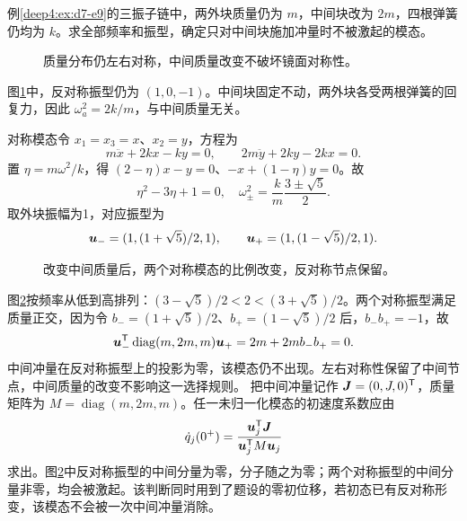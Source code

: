 \begin{exercise}[中间质量改变后的三振子链]\label{deep4:problem-exercise-10}\label{deep4:ex:d7-h10}
例\ref{deep4:ex:d7-e9}的三振子链中，两外块质量仍为 $m$，中间块改为 $2m$，四根弹簧仍均为 $k$。求全部频率和振型，确定只对中间块施加冲量时不被激起的模态。
\end{exercise}
\begin{figure}[H]\centering
{}
\caption{质量分布仍左右对称，中间质量改变不破坏镜面对称性。}\label{deep4:fig:d7-h10-q}
\end{figure}
\begin{solution}
图\ref{deep4:fig:d7-h10-q}中，反对称振型仍为 $(1,0,-1)$。中间块固定不动，两外块各受两根弹簧的回复力，因此 $\omega_a^2=2k/m$，与中间质量无关。

对称模态令 $x_1=x_3=x$、$x_2=y$，方程为
\[
m\ddot x+2kx-ky=0,\qquad
2m\ddot y+2ky-2kx=0.
\]
置 $\eta=m\omega^2/k$，得 $(2-\eta)x-y=0$、$-x+(1-\eta)y=0$。故
\[
\eta^2-3\eta+1=0,
\quad \boxed{\omega_\pm^2=\frac{k}{m}\frac{3\pm\sqrt5}{2}.}
\]
取外块振幅为1，对应振型为
\[
\bm{u}_-=(1,(1+\sqrt5)/2,1),\qquad
\bm{u}_+=(1,(1-\sqrt5)/2,1).
\]
\begin{figure}[H]\centering
{}
\caption{改变中间质量后，两个对称模态的比例改变，反对称节点保留。}\label{deep4:fig:d7-h10-s}
\end{figure}
图\ref{deep4:fig:d7-h10-s}按频率从低到高排列：$(3-\sqrt5)/2<2<(3+\sqrt5)/2$。两个对称振型满足质量正交，因为令 $b_-=(1+\sqrt5)/2$、$b_+=(1-\sqrt5)/2$ 后，$b_-b_+=-1$，故
\[
\bm{u}_-^{\mathsf T}\operatorname{diag}(m,2m,m)\bm{u}_+
=2m+2mb_-b_+=0.
\]
中间冲量在反对称振型上的投影为零，该模态仍不出现。左右对称性保留了中间节点，中间质量的改变不影响这一选择规则。
把中间冲量记作 $\bm{J}=(0,J,0)^{\mathsf T}$，质量矩阵为 $M=\operatorname{diag}(m,2m,m)$。任一未归一化模态的初速度系数应由
\[
\dot q_j(0^+)=\frac{\bm{u}_j^{\mathsf T}\bm{J}}{\bm{u}_j^{\mathsf T}M\bm{u}_j}
\]
求出。图\ref{deep4:fig:d7-h10-s}中反对称振型的中间分量为零，分子随之为零；两个对称振型的中间分量非零，均会被激起。该判断同时用到了题设的零初位移，若初态已有反对称形变，该模态不会被一次中间冲量消除。
\end{solution}

